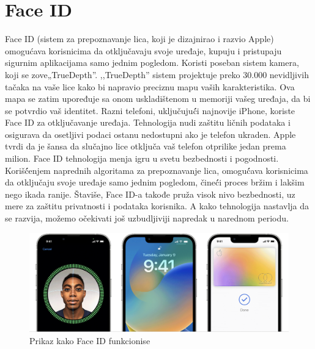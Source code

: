 \documentclass[a4paper]{article}
\begin{document}
\section{Face ID}
\label{sec:faceid}
Face ID (sistem za prepoznavanje lica, koji je dizajnirao i razvio Apple) omogućava korisnicima da otključavaju svoje uređaje, kupuju i pristupaju sigurnim aplikacijama samo jednim pogledom. Koristi poseban sistem kamera, koji se zove„TrueDepth”. ,,TrueDepth” sistem projektuje preko 30.000 nevidljivih tačaka na vaše lice kako bi napravio preciznu mapu vaših karakteristika. Ova mapa se zatim upoređuje sa onom uskladištenom u memoriji vašeg uređaja, da bi se potvrdio vaš identitet. 
Razni telefoni, uključujuć́i najnovije iPhone, koriste Face ID za otključavanje uređaja. Tehnologija nudi zaštitu ličnih podataka i osigurava da osetljivi podaci ostanu nedostupni ako je telefon ukraden. Apple tvrdi da je šansa da slučajno lice otključa vaš telefon otprilike jedan prema milion.\cite{3}
Face ID tehnologija menja igru u svetu bezbednosti i pogodnosti. Korišć́enjem naprednih algoritama za prepoznavanje lica, omoguć́ava korisnicima da otključaju svoje uređaje samo jednim pogledom, čineć́i proces bržim i lakšim nego ikada ranije. Štaviše, Face ID-a takođe pruža visok nivo bezbednosti, uz mere za zaštitu privatnosti i podataka korisnika. A kako tehnologija nastavlja da se razvija, možemo očekivati još uzbudljiviji napredak u narednom periodu.

\begin{figure}[h!]
	\begin{center}
		\includegraphics[scale=0.2]{image2.png}
	\end{center}
	\caption{Prikaz kako Face ID funkcionise}
\end{figure}
\end{document}
